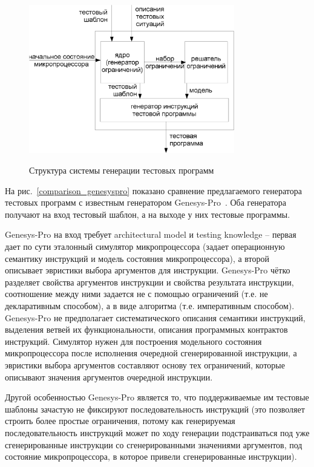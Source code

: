 \begin{figure}[h] \center
  \includegraphics[width=0.8\textwidth]{3.impl/structure}\\
  \caption{Структура системы генерации тестовых программ}\label{structure}
\end{figure}

На рис.~\ref{comparison_genesyspro} показано сравнение предлагаемого
генератора тестовых программ с известным генератором
Genesys-Pro~\cite{GenesysPro}. Оба генератора получают на вход
тестовый шаблон, а на выходе у них тестовые программы.

Genesys-Pro на вход требует architectural model и testing knowledge
-- первая дает по сути эталонный симулятор микропроцессора (задает
операционную семантику инструкций и модель состояния
микропроцессора), а второй описывает эвристики выбора аргументов для
инструкции. Genesys-Pro чётко разделяет свойства аргументов
инструкции и свойства результата инструкции, соотношение между ними
задается не с помощью ограничений (т.е. не декларативным способом),
а в виде алгоритма (т.е. императивным способом). Genesys-Pro не
предполагает систематического описания семантики инструкций,
выделения ветвей их функциональности, описания программных
контрактов инструкций. Симулятор нужен для построения модельного
состояния микропроцессора после исполнения очередной сгенерированной
инструкции, а эвристики выбора аргументов составляют основу тех
ограничений, которые описывают значения аргументов очередной
инструкции.

Другой особенностью Genesys-Pro является то, что поддерживаемые им
тестовые шаблоны зачастую не фиксируют последовательность инструкций
(это позволяет строить более простые ограничения, потому как
генерируемая последовательность инструкций может по ходу генерации
подстраиваться под уже сгенерированные инструкции со
сгенерированными значениями аргументов, под состояние
микропроцессора, в которое привели сгенерированные инструкции).

